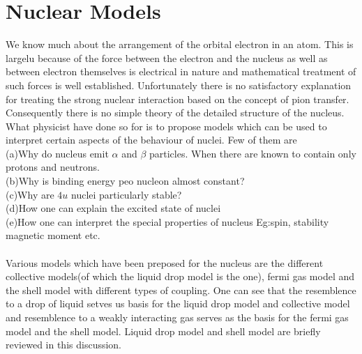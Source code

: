 \section{Nuclear Models}
We know much about the arrangement of the orbital electron in an atom. This is largelu because of the force between the electron and the nucleus as well as between electron themselves is electrical in nature and mathematical treatment of such forces is well established. Unfortunately there is no satisfactory explanation for treating the strong nuclear interaction based on the concept of pion transfer. Consequently there is no simple theory of the detailed structure of the nucleus.\\
What physicist have done so for is to propose models which can be used to interpret certain aspects of the behaviour of nuclei. Few of them are\\
(a)\quad Why do nucleus emit $\alpha$ and $\beta$ particles. When there are known to contain only protons and neutrons. \\
(b)\quad Why is binding energy peo nucleon almost constant? \\
(c)\quad Why are $4u$ nuclei particularly stable?\\
(d)\quad How one can explain the excited state of nuclei\\
(e)\quad How one can interpret the special properties of nucleus 
Eg:\quad spin, stability magnetic moment etc.\\\\
Various models which have been preposed for the nucleus are the different collective models(of which the liquid drop model is the one), fermi gas model and the shell model with different types of coupling. One can see that the resemblence to a drop of liquid setves us basis for the liquid drop model and collective model and resemblence to a weakly interacting gas serves as the basis for the fermi gas model and the shell model. Liquid drop model and shell model are briefly reviewed in this discussion.  \\
